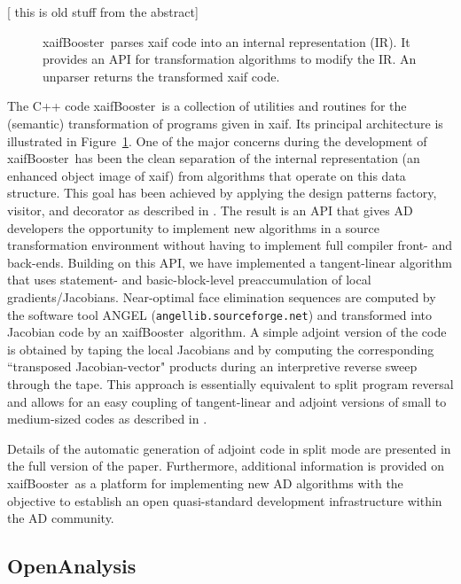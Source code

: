 \documentclass[acmtocl,acmnow]{acmtrans2m}
\newcommand{\OpenAnalysis}{OpenAnalysis}
\newcommand{\xaifBooster}{xaifBooster}
\newcommand{\reffig}[1]{Figure~\ref{#1}}
\begin{document}
{\color{Blue} [ this is old stuff from the abstract]  
\begin{figure}[htb]
\caption{\xaifBooster\ parses xaif code into an internal representation (IR).
It provides an API for transformation algorithms to modify the IR. An unparser
returns the transformed xaif code.} \label{fig:xaifBooster}
\end{figure}
The C++ code \xaifBooster\ is a collection of utilities and routines for the
(semantic) transformation of programs given in xaif. Its principal architecture 
is illustrated in \reffig{fig:xaifBooster}. One of the major concerns during
the development of \xaifBooster\ has been the clean separation of the internal
representation (an enhanced object image of xaif) from algorithms that operate 
on this data structure. This goal has been achieved by applying the design 
patterns \cite{DesignPatterns} factory, visitor, and decorator as described in \cite{UtNa03}.
The result is an API that gives AD developers the opportunity
to implement new algorithms in a source transformation environment without
having to implement full compiler front- and back-ends. Building on
this API, we have implemented a tangent-linear algorithm that uses statement-
\cite{SEUpreacc} and basic-block-level preaccumulation of local 
gradients/Jacobians. Near-optimal face elimination \cite{ElimTechMP} sequences 
are computed by the software tool 
ANGEL \cite{AGN03,SAGA} ({\tt angellib.sourceforge.net}) and transformed into 
Jacobian code by
an \xaifBooster\ algorithm. A simple adjoint version of the code is obtained
by taping the local Jacobians 
and by computing the corresponding ``transposed Jacobian-vector" products 
during an interpretive reverse sweep through the tape. This approach is
essentially equivalent to split program reversal \cite{Gri00} and allows
for an easy coupling of tangent-linear and adjoint versions of small to 
medium-sized codes as described in \cite{NaHe03}. 

Details of the automatic generation of adjoint code in split mode are presented
in the full version of the paper. Furthermore, additional information is 
provided on \xaifBooster\ as a platform for implementing new AD algorithms with 
the objective to establish an open quasi-standard development infrastructure
within the AD community.
}
\subsection{\OpenAnalysis} \label{ssec:openanalysis}
\end{document}
